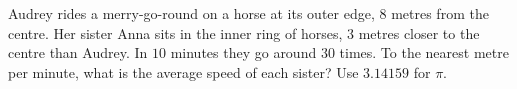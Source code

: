 Audrey rides a merry-go-round on a horse at its outer edge, $8$ metres from the centre. Her sister Anna sits in the inner ring of horses, $3$ metres closer to the centre than Audrey. In $10$ minutes they go around $30$ times. To the nearest metre per minute, what is the average speed of each sister? Use $3.14159$ for $\pi$.
